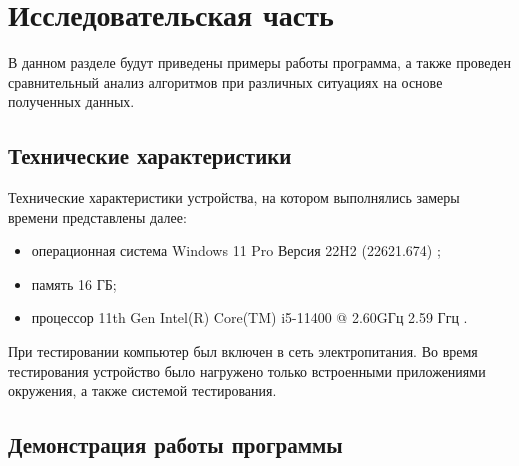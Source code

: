 \chapter{Исследовательская часть}

В данном разделе будут приведены примеры работы программа, а также проведен сравнительный анализ алгоритмов при различных ситуациях на основе полученных данных.

\section{Технические характеристики}

Технические характеристики устройства, на котором выполнялись замеры времени представлены далее:

\begin{itemize}
	\item операционная система Windows 11 Pro Версия 22H2 (22621.674) \cite{wind};
	\item память 16 ГБ;
	\item процессор 11th Gen Intel(R) Core(TM) i5-11400 @ 2.60GГц 2.59 Ггц \cite{proc}.
\end{itemize}

При тестировании компьютер был включен в сеть электропитания. Во время тестирования устройство было нагружено только встроенными приложениями окружения, а также системой тестирования.

\section{Демонстрация работы программы}

